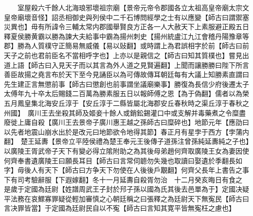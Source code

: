　　室屋殺六千餘人北海琅邪壞祖宗廟【景帝元帝令郡國各立太祖高皇帝廟太宗文皇帝廟壞音怪】詔丞相御史與列侯中二千石博問經學之士有以應變【師古曰謂禦塞災異也】毋有所諱令三輔太常内郡國舉賢良方正各一人大赦天下上素服避正殿五日釋夏侯勝黄霸以勝為諫大夫給事中霸為揚州刺史【揚州統盧江九江會稽丹陽豫章等郡】勝為人質樸守正簡易無威儀【易以䜴翻】或時謂上為君誤相字於前【師古曰前天子之前也君前臣名不當相呼字也】上亦以是親信之【師古曰知其質樸也】嘗見出道上語【師古曰入見天子而以其言為外人道之見賢遍翻】上聞而讓勝勝曰陛下所言善臣故揚之堯言布於天下至今見誦臣以為可傳故傳耳朝廷每有大議上知勝素直謂曰先生建正言無懲前事【師古曰懲創也前事謂坐議廟樂事】勝復為長信少府後遷太子太傅年九十卒太后賜錢二百萬為勝素服五日以報師傅之恩【為于偽翻】儒者以為榮　五月鳳皇集北海安丘淳于【安丘淳于二縣皆屬北海郡安丘春秋時之渠丘淳于春秋之州國】　廣川王去坐殺其師及姬妾十餘人或銷鈆錫灌口中或支解并毒藥煮之令糜盡廢徙上庸自殺【廣川王去景帝子廣川惠王越之孫師古曰糜碎也】地節元年【應劭曰以先者地震山崩水出於是改元曰地節欲令地得其節】春正月有星孛于西方【孛蒲内翻】　楚王延夀【景帝立平陸侯禮為楚王奉元王後傳子道孫注曾孫純延夀純之子也】以廣陵王胥武帝子天下有變必得立隂附助之為其後母弟趙何齊取廣陵王女為妻因使何齊奉書遺廣陵王曰願長耳目【師古曰言常伺聼勿失幾也取讀曰娶遺於季翻長如字】毋後人有天下【師古曰方争天下勿使在人後後戶覯翻】何齊父長年上書告之事下有司考驗辭服【下遐嫁翻】冬十一月延夀自殺胥勿治　十二月癸亥晦日有食之　是歲于定國為廷尉【姓譜周武王子封於䢴子孫以國為氏其後去邑單為于】定國决疑平法務在哀鰥寡罪疑從輕加審慎之心朝廷稱之曰張釋之為廷尉天下無寃民【師古曰言决罪皆當】于定國為廷尉民自以不寃【師古曰言知其寛平皆無寃枉之慮也】

